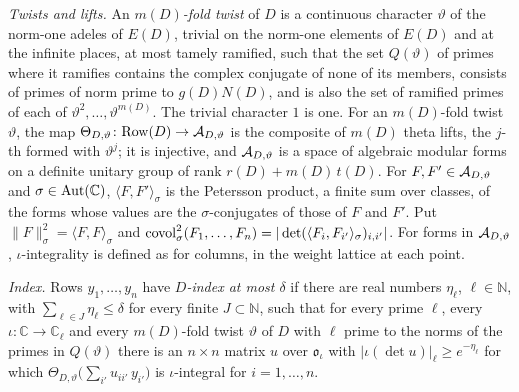 {\emph{Twists and lifts.} An \emph{$m(D)$-fold twist} of $D$ is a continuous character $\vartheta$ of the norm-one adeles of
$E(D)$, trivial on the norm-one elements of $E(D)$ and at the infinite places, at most tamely ramified, such that the
set $Q(\vartheta)$ of primes where it ramifies contains the complex conjugate of none of its members, consists of
primes of norm prime to $g(D)N(D)$, and is also the set of ramified primes of each of $\vartheta^2,\dots,\vartheta^{m(D)}$. The trivial
character $1$ is one. For an $m(D)$-fold twist $\vartheta$, the map
$\Theta_{D,\vartheta}\colon\mathrm{Row}(D)\to\mathcal{A}_{D,\vartheta}$ is the composite of $m(D)$ theta lifts, the $j$-th formed with
$\vartheta^{j}$; it is injective, and $\mathcal{A}_{D,\vartheta}$ is a space of algebraic modular forms on a definite unitary
group of rank $r(D)+m(D)\,t(D)$. For $F,F'\in\mathcal{A}_{D,\vartheta}$ and $\sigma\in\operatorname{Aut}(\mathbb{C})$, $\langle F,F'\rangle_\sigma$ is the
Petersson product, a finite sum over classes, of the forms whose values are the $\sigma$-conjugates of those of $F$ and
$F'$. Put $\|F\|_\sigma^2=\langle F,F\rangle_\sigma$ and
$\operatorname{covol}_\sigma^2(F_1,\dots,F_n)=|\det(\langle F_i,F_{i'}\rangle_\sigma)_{i,i'}|$. For forms in $\mathcal{A}_{D,\vartheta}$, $\iota$-integrality is defined as for columns, in the weight lattice at each point.

\emph{Index.} Rows $y_1,\dots,y_n$ have \emph{$D$-index at most $\delta$} if there are real numbers $\eta_\ell$,
$\ell\in\mathbb{N}$, with $\sum_{\ell\in J}\eta_\ell\le\delta$ for every finite $J\subset\mathbb{N}$, such that for every
prime $\ell$, every $\iota\colon\mathbb{C}\to\mathbb{C}_\ell$ and every $m(D)$-fold twist $\vartheta$ of $D$ with $\ell$ prime to
the norms of the primes in $Q(\vartheta)$ there is an $n\times n$ matrix $u$ over $\mathfrak{o}_\iota$ with
$|\iota(\det u)|_\ell\ge e^{-\eta_\ell}$ for which $\Theta_{D,\vartheta}\bigl(\sum_{i'}u_{ii'}\,y_{i'}\bigr)$ is $\iota$-integral
for $i=1,\dots,n$.}


